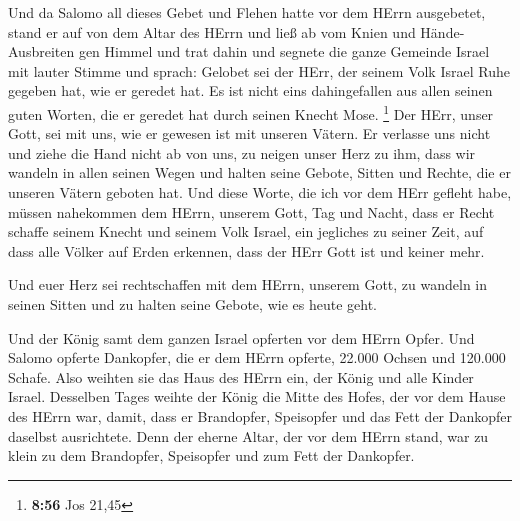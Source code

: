  Und da Salomo all dieses Gebet und Flehen hatte vor dem
HErrn ausgebetet, stand er auf von dem Altar des HErrn und ließ ab vom
Knien und Hände-Ausbreiten gen Himmel  und trat dahin und
segnete die ganze Gemeinde Israel mit lauter Stimme und sprach:
 Gelobet sei der HErr, der seinem Volk Israel Ruhe gegeben
hat, wie er geredet hat. Es ist nicht eins dahingefallen aus allen
seinen guten Worten, die er geredet hat durch seinen Knecht Mose.
\footnote{\textbf{8:56} Jos 21,45}  Der HErr, unser Gott,
sei mit uns, wie er gewesen ist mit unseren Vätern. Er verlasse uns
nicht und ziehe die Hand nicht ab von uns,  zu neigen unser
Herz zu ihm, dass wir wandeln in allen seinen Wegen und halten seine
Gebote, Sitten und Rechte, die er unseren Vätern geboten hat.
 Und diese Worte, die ich vor dem HErr gefleht habe, müssen
nahekommen dem HErrn, unserem Gott, Tag und Nacht, dass er Recht schaffe
seinem Knecht und seinem Volk Israel, ein jegliches zu seiner Zeit,
 auf dass alle Völker auf Erden erkennen, dass der HErr
Gott ist und keiner mehr.

 Und euer Herz sei rechtschaffen mit dem HErrn, unserem
Gott, zu wandeln in seinen Sitten und zu halten seine Gebote, wie es
heute geht.

 Und der König samt dem ganzen Israel opferten vor dem
HErrn Opfer.  Und Salomo opferte Dankopfer, die er dem
HErrn opferte, 22.000 Ochsen und 120.000 Schafe. Also weihten sie das
Haus des HErrn ein, der König und alle Kinder Israel. 
Desselben Tages weihte der König die Mitte des Hofes, der vor dem Hause
des HErrn war, damit, dass er Brandopfer, Speisopfer und das Fett der
Dankopfer daselbst ausrichtete. Denn der eherne Altar, der vor dem HErrn
stand, war zu klein zu dem Brandopfer, Speisopfer und zum Fett der
Dankopfer.

